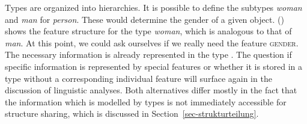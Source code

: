 Types are organized into hierarchies.
It is possible to define the subtypes  \textit{woman} and \textit{man} for  \textit{person}. These would determine the gender of a given object.
() shows the feature structure for the type \textit{woman}, which is analogous to that of \textit{man}.
\ea
{}
\z
At this point, we could ask ourselves if we really need the feature \textsc{gender}. The necessary information is already represented in the type .
The question if specific information is represented by special features or whether it is stored in a type without a corresponding individual feature will
surface again in the discussion of linguistic analyses.
Both alternatives differ mostly in the fact that the information which is modelled by types is not
immediately accessible for structure sharing, which is discussed in Section~\ref{sec-strukturteilung}.

